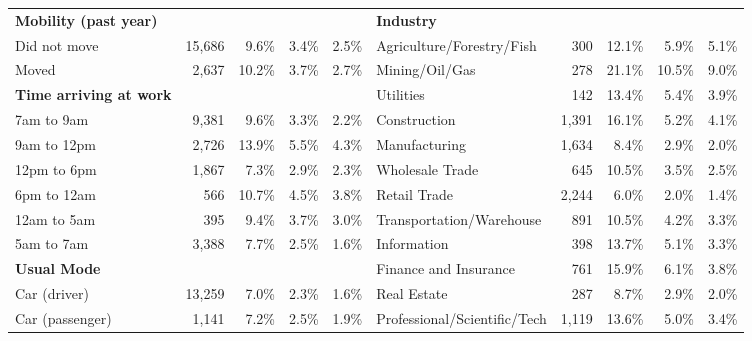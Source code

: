 \documentclass[10 pt,letterpaper]{article}
\begin{document}
\begin{table}[H]
{\begin{tabular}{lrrrrlrrrr}
			\textbf{Mobility (past year)}  &        &             &            &            & \textbf{Industry}                 &       &             &             &           \\
			Did not move                   & 15,686 & 9.6\%       & 3.4\%      & 2.5\%      & Agriculture/Forestry/Fish         & 300   & 12.1\%      & 5.9\%       & 5.1\%     \\
			Moved                          & 2,637  & 10.2\%      & 3.7\%      & 2.7\%      & Mining/Oil/Gas                    & 278   & 21.1\%      & 10.5\%      & 9.0\%     \\
			\textbf{Time arriving at work} &        &             &            &            & Utilities                         & 142   & 13.4\%      & 5.4\%       & 3.9\%     \\
			7am to 9am                     & 9,381  & 9.6\%       & 3.3\%      & 2.2\%      & Construction                      & 1,391 & 16.1\%      & 5.2\%       & 4.1\%     \\
			9am to 12pm                    & 2,726  & 13.9\%      & 5.5\%      & 4.3\%      & Manufacturing                     & 1,634 & 8.4\%       & 2.9\%       & 2.0\%     \\
			12pm to 6pm                    & 1,867  & 7.3\%       & 2.9\%      & 2.3\%      & Wholesale Trade                   & 645   & 10.5\%      & 3.5\%       & 2.5\%     \\
			6pm to 12am                    & 566    & 10.7\%      & 4.5\%      & 3.8\%      & Retail Trade                      & 2,244 & 6.0\%       & 2.0\%       & 1.4\%     \\
			12am to 5am                    & 395    & 9.4\%       & 3.7\%      & 3.0\%      & Transportation/Warehouse          & 891   & 10.5\%      & 4.2\%       & 3.3\%     \\
			5am to 7am                     & 3,388  & 7.7\%       & 2.5\%      & 1.6\%      & Information                       & 398   & 13.7\%      & 5.1\%       & 3.3\%     \\
			\textbf{Usual Mode}            &        &             &            &            & Finance and Insurance             & 761   & 15.9\%      & 6.1\%       & 3.8\%     \\
			Car (driver)                   & 13,259 & 7.0\%       & 2.3\%      & 1.6\%      & Real Estate                       & 287   & 8.7\%       & 2.9\%       & 2.0\%     \\
			Car (passenger)                & 1,141  & 7.2\%       & 2.5\%      & 1.9\%      & Professional/Scientific/Tech      & 1,119 & 13.6\%      & 5.0\%       & 3.4\%     \\

\end{tabular}}
\end{table}
\end{document}
